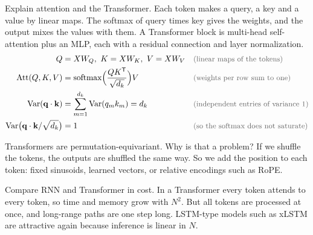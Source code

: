 \begin{qabox}{Explain attention and the Transformer.}
\explain Each token makes a query, a key and a value by linear maps. The softmax of query times key
gives the weights, and the output mixes the values with them. A Transformer block is multi-head
self-attention plus an MLP, each with a residual connection and layer normalization.
\derive
\begin{align*}
Q &= XW_Q,\ K = XW_K,\ V = XW_V \why{linear maps of the tokens} \\
\mathrm{Att}(Q,K,V) &= \mathrm{softmax}\Bigl(\frac{QK^{\mathsf{T}}}{\sqrt{d_k}}\Bigr)V \why{weights per row sum to one} \\
\mathrm{Var}(\mathbf{q}\cdot\mathbf{k}) &= \sum_{m=1}^{d_k}\mathrm{Var}(q_m k_m) = d_k \why{independent entries of variance 1} \\
\mathrm{Var}\bigl(\mathbf{q}\cdot\mathbf{k}/\sqrt{d_k}\bigr) &= 1 \why{so the softmax does not saturate}
\end{align*}
\end{qabox}

\begin{qabox}{Transformers are permutation-equivariant. Why is that a problem?}
\explain If we shuffle the tokens, the outputs are shuffled the same way. So we add the position to
each token: fixed sinusoids, learned vectors, or relative encodings such as RoPE.
\end{qabox}

\begin{qabox}{Compare RNN and Transformer in cost.}
\explain In a Transformer every token attends to every token, so time and memory grow with $N^2$.
But all tokens are processed at once, and long-range paths are one step long. LSTM-type models such
as xLSTM are attractive again because inference is linear in $N$.
\end{qabox}

